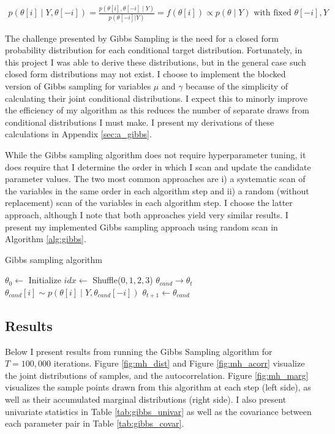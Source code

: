 \documentclass{article}
\begin{document}
\begin{align}
  p(\theta[i] \mid Y, \theta[-i]) = \frac{p(\theta[i], \theta[-i] \mid Y)}{p(\theta[-i] | Y)} = f(\theta[i]) \propto p(\theta \mid Y) \textrm{ with fixed } \theta[-i], Y
\end{align}

The challenge presented by Gibbs Sampling is the need for a closed form probability distribution for each conditional target distribution. Fortunately, in this project I was able to derive these distributions, but in the general case such closed form distributions may not exist. I choose to implement the blocked version of Gibbs sampling for variables $\mu$ and $\gamma$ because of the simplicity of calculating their joint conditional distributions. I expect this to minorly improve the efficiency of my algorithm as this reduces the number of separate draws from conditional distributions I must make. I present my derivations of these calculations in Appendix \ref{sec:a_gibbs}. 

While the Gibbs sampling algorithm does not require hyperparameter tuning, it does require that I determine the order in which I scan and update the candidate parameter values. The two most common approaches are i) a systematic scan of the variables in the same order in each algorithm step and ii) a random (without replacement) scan of the variables in each algorithm step. I choose the latter approach, although I note that both approaches yield very similar results. I present my implemented Gibbs sampling approach using random scan in Algorithm \ref{alg:gibbs}. 

\begin{algorithm}[H]
  \caption{\label{alg:gibbs}Gibbs sampling algorithm}
    \begin{algorithmic}[1]
      \State $\theta_0 \longleftarrow$  Initialize
        \State $idx \longleftarrow$ Shuffle($0,1,2,3$) 
        \State $\theta_{cand} \longrightarrow \theta_t$
         
          \State $\theta_{cand}[i] \sim p(\theta[i] \mid Y, \theta_{cand}[-i])$ 
        \EndFor
        \State $\theta_{t+1} \longleftarrow \theta_{cand}$
      \EndFor
    \end{algorithmic}
  \end{algorithm}


\subsection{Results}
Below I present results from running the Gibbs Sampling algorithm for $T=100,000$ iterations. Figure \ref{fig:mh_dist} and Figure \ref{fig:mh_acorr} visualize the joint distributions of samples, and the autocorrelation. Figure \ref{fig:mh_marg} visualizes the sample points drawn from this algorithm at each step (left side), as well as their accumulated marginal distributions (right side). I also present univariate statistics in Table \ref{tab:gibbs_univar} as well as the covariance between each parameter pair in Table \ref{tab:gibbs_covar}. 
\end{document}
